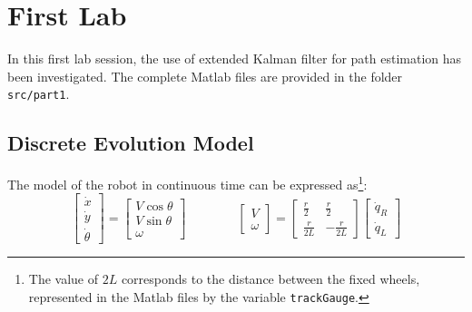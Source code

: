 \section{First Lab}

In this first lab session, the use of extended Kalman filter for path estimation has been investigated. The complete Matlab files are provided in the folder \texttt{src/part1}.

\subsection{Discrete Evolution Model}\label{secDiscreteModel}

The model of the robot in continuous time can be expressed as\footnote{The value of $2L$ corresponds to the distance between the fixed wheels, represented in the Matlab files by the variable \texttt{trackGauge}.}:
$$\left[\begin{array}{c}
\dot{x} \\ \dot{y} \\ \dot{\theta}
\end{array}\right] =
\left[\begin{array}{c}
V\cos\theta \\ V\sin\theta \\ \omega
\end{array}\right]
\qquad\qquad
\left[\begin{array}{c}
V \\ \omega
\end{array}\right] =
\left[\begin{array}{cc}
\frac{r}{2} & \frac{r}{2} \\ \frac{r}{2L} & -\frac{r}{2L}
\end{array}\right] 
\left[\begin{array}{c}
\dot{q}_R \\ \dot{q}_L
\end{array}\right]
$$

